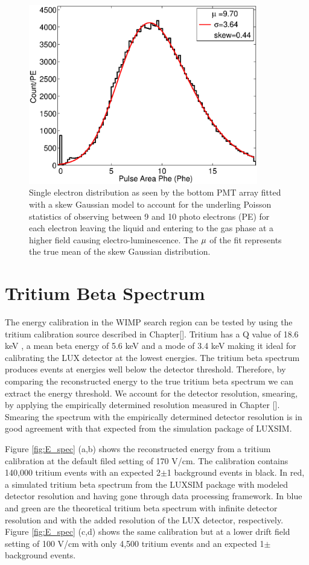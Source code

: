 \begin{figure}[h!]\centering
\includegraphics[width=100mm]{Chapter_E_Scale/Figures/bottom_SE.eps}
\caption{Single electron distribution as seen by the bottom PMT array fitted with a skew Gaussian model to account for the underling Poisson statistics of observing between 9 and 10 photo electrons (PE) for each electron leaving the liquid and entering to the gas phase at a higher field causing electro-luminescence. The $\rm \mu$ of the fit represents the true mean of the skew Gaussian distribution. }
\label{fig:SingleE}
\end{figure}

\newpage

\section{Tritium Beta Spectrum}

The energy calibration in the WIMP search region can be tested by using the tritium calibration source described in Chapter[]. Tritium has a Q value of 18.6 keV \cite{Tritium_Q}, a mean beta energy of 5.6 keV \cite{Tritium_Mean} and a mode of 3.4 keV \cite{Tritium_Eq} making it ideal for calibrating the LUX detector at the lowest energies. The tritium beta spectrum produces events at energies well below the detector threshold. Therefore, by comparing the reconstructed energy to the true tritium beta spectrum we can extract the energy threshold. We account for the detector resolution, smearing, by applying the empirically determined resolution measured in Chapter []. Smearing the spectrum with the empirically determined detector resolution is in good agreement with that expected from the simulation package of LUXSIM.

Figure \ref{fig:E_spec} (a,b) shows the reconstructed energy from a tritium calibration at the default filed setting of 170 V/cm. The calibration contains 140,000 tritium events with an expected 2$\pm$1 background events in black. In red, a simulated tritium beta spectrum from the LUXSIM package with modeled detector resolution and having gone through data processing framework.  In blue and green are the theoretical tritium beta spectrum with infinite detector resolution and with the added resolution of the LUX detector, respectively.  Figure \ref{fig:E_spec} (c,d) shows the same calibration but at a lower drift field setting of 100 V/cm with only 4,500 tritium events and an expected 1$\pm$ background events.


